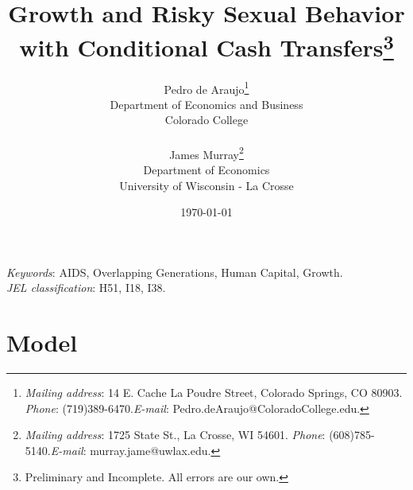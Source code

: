 \documentclass[12pt]{article}
\begin{document}
\begin{titlepage}
\begin{singlespace}
\title{Growth and Risky Sexual Behavior with Conditional Cash Transfers\footnote{Preliminary and Incomplete.  All errors are our own.}}
\date{\today}
\author{
Pedro de Araujo\footnote{\textit{Mailing address}: 14 E. Cache La Poudre Street, Colorado Springs, CO  80903.  \textit{Phone}: (719)389-6470.\newline  \textit{E-mail}: Pedro.deAraujo@ColoradoCollege.edu.}\\Department of Economics and Business\\Colorado College \\\\James Murray\footnote{\textit{Mailing address}: 1725 State St., La Crosse, WI  54601. \textit{Phone}: (608)785-5140.\newline  \textit{E-mail}: murray.jame@uwlax.edu.}\\Department of Economics\\University of Wisconsin - La Crosse
}

\maketitle

\thispagestyle{empty}

 \newline 

\noindent \textit{Keywords}: AIDS, Overlapping Generations, Human Capital, Growth. \\
\noindent \textit{JEL classification}: H51, I18, I38.
\end{singlespace}
\end{titlepage}

\newpage

\section{Model}
\end{document}
